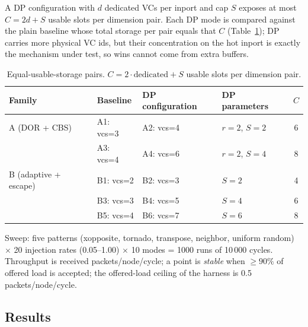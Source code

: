 \documentclass[10pt]{article}
\begin{document}
A DP configuration with $d$ dedicated VCs per inport and cap $S$ exposes
at most $C = 2d + S$ usable slots per dimension pair. Each DP mode is
compared against the plain baseline whose total storage per pair equals
that $C$ (Table~\ref{tab:configs}); DP carries more physical VC ids, but
their concentration on the hot inport is exactly the mechanism under
test, so wins cannot come from extra buffers.

\begin{table}[H]
\centering
\small
\begin{tabular}{llllc}
\toprule
Family & Baseline & DP configuration & DP parameters & $C$ \\
\midrule
A (DOR + CBS) & A1: vcs=3 & A2: vcs=4 & $r{=}2$, $S{=}2$ & 6 \\
              & A3: vcs=4 & A4: vcs=6 & $r{=}2$, $S{=}4$ & 8 \\
B (adaptive + escape) & B1: vcs=2 & B2: vcs=3 & $S{=}2$ & 4 \\
              & B3: vcs=3 & B4: vcs=5 & $S{=}4$ & 6 \\
              & B5: vcs=4 & B6: vcs=7 & $S{=}6$ & 8 \\
\bottomrule
\end{tabular}
\caption{Equal-usable-storage pairs. $C = 2\cdot\text{dedicated} + S$
usable slots per dimension pair.}
\label{tab:configs}
\end{table}

Sweep: five patterns (xopposite, tornado, transpose, neighbor, uniform
random) $\times$ 20 injection rates (0.05--1.00) $\times$ 10 modes = 1000
runs of 10\,000 cycles. Throughput is received packets/node/cycle; a
point is \emph{stable} when $\ge 90\%$ of offered load is accepted; the
offered-load ceiling of the harness is 0.5 packets/node/cycle.

\subsection{Results}
\end{document}
